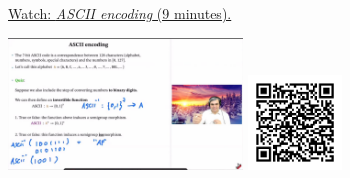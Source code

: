
\begin{minipage}{10cm}
    \href{https://act4e-spring21.netlify.app/videos/spring2021-morphisms:morphisms:semigroup-morphisms:ascii.html}{Watch: \emph{ASCII encoding} (9 minutes).}
        
    \href{https://act4e-spring21.netlify.app/videos/spring2021-morphisms:morphisms:semigroup-morphisms:ascii.html}{\includegraphics[height=3.5cm]{spring2021-morphisms:morphisms:semigroup-morphisms:ascii/thumbnails.jpg}}
    \href{https://act4e-spring21.netlify.app/videos/spring2021-morphisms:morphisms:semigroup-morphisms:ascii.html}{\includegraphics[height=2.5cm]{spring2021-morphisms:morphisms:semigroup-morphisms:ascii/qrcode.png}}
\end{minipage}
